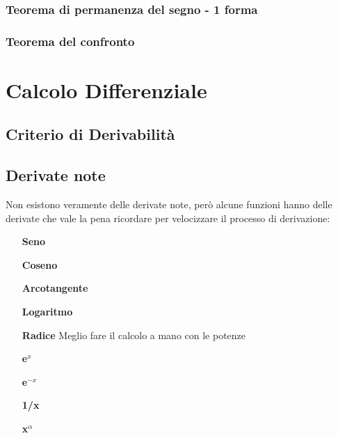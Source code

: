 \documentclass[12pt, a4paper, openany]{book}
\begin{document}
	\subsection*{Teorema di permanenza del segno - 1 forma}
\subsection*{Teorema del confronto}

	\chapter{Calcolo Differenziale}
	\section{Criterio di Derivabilità}
	\section{Derivate note}
	Non esistono veramente delle derivate note, però alcune funzioni hanno delle derivate che vale la pena ricordare per velocizzare il processo di derivazione:

	\begin{itemize}
		\item[\textbf{Seno}] 
		\item[\textbf{Coseno}] 
		\item[\textbf{Arcotangente}] 
		\item[\textbf{Logaritmo}] 
		\item[\textbf{Radice}] Meglio fare il calcolo a mano con le potenze%
		\item[\textbf{e$^x$}] 
		\item[\textbf{e$^{-x}$}] 
		\item[\textbf{1/x}] 
		\item[\textbf{x$^\alpha$}] 
	\end{itemize}
\end{document}
